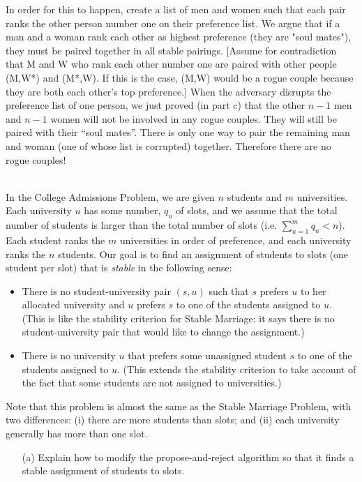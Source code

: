 \documentclass[11pt]{article}
\begin{document}
\begin{qunlist}
\begin{itemize}
{In order for this to happen, create a list of men and women such that 
each pair ranks the other person number one on their preference list. 
We argue that if a man and a woman rank each other as highest preference 
(they are "soul mates"), 
they must be paired together in all stable pairings.
[Assume for contradiction that M and W who rank each other number one 
are paired with other people (M,W*) and (M*,W). 
If this is the case, (M,W) would be a rogue couple because they are both each other's top preference.] 
When the adversary disrupts the preference list of one person, 
we just proved (in part c) that the other $n-1$ men and $n-1$ women will not be involved in any rogue couples.  They will still be paired with their ``soul mates''. 
There is only one way to pair the remaining man and woman (one of whose list is corrupted) together. 
Therefore there are no rogue couples!
}
\fi


\end{itemize}



\newpage

\\
In the College Admissions Problem, we are given $n$ students and $m$ universities. 
Each university $u$ has some number, $q_u$ of slots, 
and we assume that the total number of students is larger than the total number of slots
(i.e. $\sum_{u=1}^m{q_u} < n$). 
Each student ranks the $m$ universities in order of preference, and each university ranks the $n$ students. 
Our goal is to find an assignment of students to slots (one student per slot) that is \textit{stable} 
in the following sense:
\begin{itemize}
\item There is no student-university pair $(s,u)$ such that $s$ prefers $u$ to her allocated university 
and $u$ prefers $s$ to one of the students assigned to $u$. 
(This is like the stability criterion for Stable Marriage: 
it says there is no student-university pair that would like to change the assignment.)
\item There is no university $u$ that prefers some unassigned student $s$ to one of the students assigned to $u$.
(This extends the stability criterion to take account of the fact that 
some students are not assigned to universities.)
\end{itemize}

Note that this problem is almost the same as the Stable Marriage Problem, with two differences:
(i) there are more students than slots; and
(ii) each university generally has more than one slot.
\begin{itemize}
\item[(a)] Explain how to modify the propose-and-reject algorithm so that 
it finds a stable assignment of students to slots.


\end{itemize}
\end{qunlist}
\end{document}
